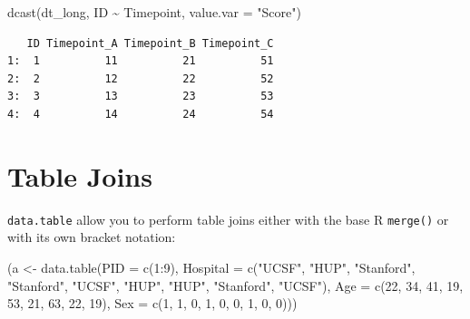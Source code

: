 \documentclass[
]{book}
\newenvironment{Shaded}{\begin{snugshade}}{\end{snugshade}}
\newcommand{\AttributeTok}[1]{\textcolor[rgb]{0.77,0.63,0.00}{#1}}
\newcommand{\DecValTok}[1]{\textcolor[rgb]{0.00,0.00,0.81}{#1}}
\newcommand{\FunctionTok}[1]{\textcolor[rgb]{0.00,0.00,0.00}{#1}}
\newcommand{\NormalTok}[1]{#1}
\newcommand{\OtherTok}[1]{\textcolor[rgb]{0.56,0.35,0.01}{#1}}
\newcommand{\SpecialCharTok}[1]{\textcolor[rgb]{0.00,0.00,0.00}{#1}}
\newcommand{\StringTok}[1]{\textcolor[rgb]{0.31,0.60,0.02}{#1}}
\begin{document}
\begin{Shaded}
\begin{Highlighting}[]
\FunctionTok{dcast}\NormalTok{(dt\_long, ID }\SpecialCharTok{\textasciitilde{}}\NormalTok{ Timepoint,}
      \AttributeTok{value.var =} \StringTok{"Score"}\NormalTok{)}
\end{Highlighting}
\end{Shaded}

\begin{verbatim}
   ID Timepoint_A Timepoint_B Timepoint_C
1:  1          11          21          51
2:  2          12          22          52
3:  3          13          23          53
4:  4          14          24          54
\end{verbatim}

\hypertarget{table-joins}{%
\section{Table Joins}\label{table-joins}}

\texttt{data.table} allow you to perform table joins either with the base R \texttt{merge()} or with its own bracket notation:

\begin{Shaded}
\begin{Highlighting}[]
\NormalTok{(a }\OtherTok{\textless{}{-}} \FunctionTok{data.table}\NormalTok{(}\AttributeTok{PID =} \FunctionTok{c}\NormalTok{(}\DecValTok{1}\SpecialCharTok{:}\DecValTok{9}\NormalTok{),}
                \AttributeTok{Hospital =} \FunctionTok{c}\NormalTok{(}\StringTok{"UCSF"}\NormalTok{, }\StringTok{"HUP"}\NormalTok{, }\StringTok{"Stanford"}\NormalTok{, }
                             \StringTok{"Stanford"}\NormalTok{, }\StringTok{"UCSF"}\NormalTok{, }\StringTok{"HUP"}\NormalTok{, }
                             \StringTok{"HUP"}\NormalTok{, }\StringTok{"Stanford"}\NormalTok{, }\StringTok{"UCSF"}\NormalTok{),}
                \AttributeTok{Age =} \FunctionTok{c}\NormalTok{(}\DecValTok{22}\NormalTok{, }\DecValTok{34}\NormalTok{, }\DecValTok{41}\NormalTok{, }\DecValTok{19}\NormalTok{, }\DecValTok{53}\NormalTok{, }\DecValTok{21}\NormalTok{, }\DecValTok{63}\NormalTok{, }\DecValTok{22}\NormalTok{, }\DecValTok{19}\NormalTok{),}
                \AttributeTok{Sex =} \FunctionTok{c}\NormalTok{(}\DecValTok{1}\NormalTok{, }\DecValTok{1}\NormalTok{, }\DecValTok{0}\NormalTok{, }\DecValTok{1}\NormalTok{, }\DecValTok{0}\NormalTok{, }\DecValTok{0}\NormalTok{, }\DecValTok{1}\NormalTok{, }\DecValTok{0}\NormalTok{, }\DecValTok{0}\NormalTok{)))}
\end{Highlighting}
\end{Shaded}
\end{document}

